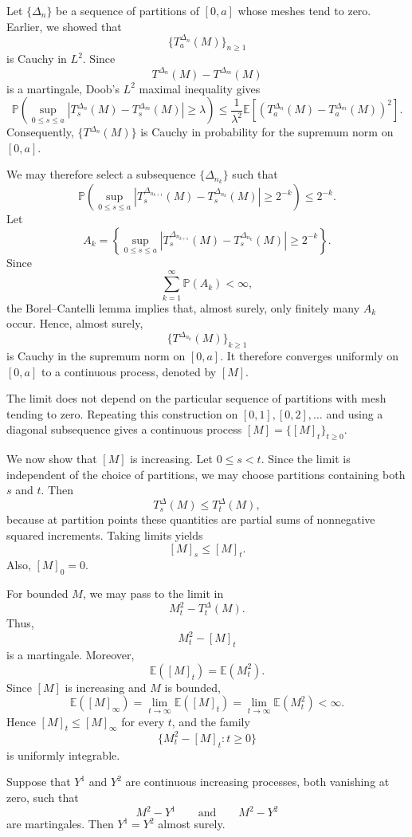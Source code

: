 Let \(\{\Delta_n\}\) be a sequence of partitions of \([0,a]\) whose meshes tend to zero. Earlier, we showed that
\[
\{T_a^{\Delta_n}(M)\}_{n\ge 1}
\]
is Cauchy in \(L^2\). Since
\[
T^{\Delta_n}(M)-T^{\Delta_m}(M)
\]
is a martingale, Doob's \(L^2\) maximal inequality gives
\[
\mathbb P\left(
\sup_{0\le s\le a}
\left|T_s^{\Delta_n}(M)-T_s^{\Delta_m}(M)\right|
\ge \lambda
\right)
\le
\frac{1}{\lambda^2}
\mathbb E\left[
\left(T_a^{\Delta_n}(M)-T_a^{\Delta_m}(M)\right)^2
\right].
\]
Consequently, \(\{T^{\Delta_n}(M)\}\) is Cauchy in probability for the supremum norm on \([0,a]\).

We may therefore select a subsequence \(\{\Delta_{n_k}\}\) such that
\[
\mathbb P\left(
\sup_{0\le s\le a}
\left|T_s^{\Delta_{n_{k+1}}}(M)-T_s^{\Delta_{n_k}}(M)\right|
\ge 2^{-k}
\right)
\le 2^{-k}.
\]
Let
\[
A_k=
\left\{
\sup_{0\le s\le a}
\left|T_s^{\Delta_{n_{k+1}}}(M)-T_s^{\Delta_{n_k}}(M)\right|
\ge 2^{-k}
\right\}.
\]
Since
\[
\sum_{k=1}^{\infty}\mathbb P(A_k)<\infty,
\]
the Borel--Cantelli lemma implies that, almost surely, only finitely many \(A_k\) occur. Hence, almost surely,
\[
\{T^{\Delta_{n_k}}(M)\}_{k\ge 1}
\]
is Cauchy in the supremum norm on \([0,a]\). It therefore converges uniformly on \([0,a]\) to a continuous process, denoted by \([M]\).

The limit does not depend on the particular sequence of partitions with mesh tending to zero. Repeating this construction on \([0,1],[0,2],\ldots\) and using a diagonal subsequence gives a continuous process \([M]=\{[M]_t\}_{t\ge0}\).

We now show that \([M]\) is increasing. Let \(0\le s<t\). Since the limit is independent of the choice of partitions, we may choose partitions containing both \(s\) and \(t\). Then
\[
T_s^\Delta(M)\le T_t^\Delta(M),
\]
because at partition points these quantities are partial sums of nonnegative squared increments. Taking limits yields
\[
[M]_s\le [M]_t.
\]
Also, \([M]_0=0\).

For bounded \(M\), we may pass to the limit in
\[
M_t^2-T_t^\Delta(M).
\]
Thus,
\[
M_t^2-[M]_t
\]
is a martingale. Moreover,
\[
\mathbb E([M]_t)=\mathbb E(M_t^2).
\]
Since \([M]\) is increasing and \(M\) is bounded,
\[
\mathbb E([M]_\infty)
=
\lim_{t\to\infty}\mathbb E([M]_t)
=
\lim_{t\to\infty}\mathbb E(M_t^2)
<\infty.
\]
Hence \([M]_t\le [M]_\infty\) for every \(t\), and the family
\[
\{M_t^2-[M]_t:t\ge0\}
\]
is uniformly integrable.

\begin{theorem}
Suppose that \(Y^1\) and \(Y^2\) are continuous increasing processes, both vanishing at zero, such that
\[
M^2-Y^1
\qquad\text{and}\qquad
M^2-Y^2
\]
are martingales. Then \(Y^1=Y^2\) almost surely.
\end{theorem}

